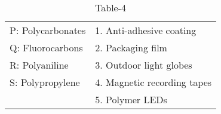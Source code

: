 \begin{table}[htbp]
\centering
\caption{Table-4}
\label{table4}

\begin{tabular}{l l}
P: Polycarbonates & 1. Anti-adhesive coating \\
Q: Fluorocarbons & 2. Packaging film \\
R: Polyaniline & 3. Outdoor light globes \\
S: Polypropylene & 4. Magnetic recording tapes \\
& 5. Polymer LEDs \\
\end{tabular}

\end{table}